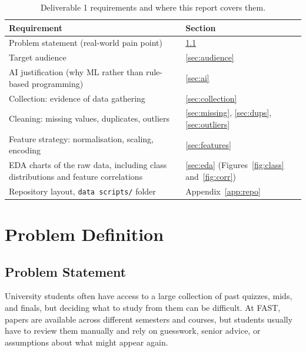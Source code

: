 \documentclass[11pt,a4paper]{article}
\newcommand{\file}[1]{\texttt{#1}}
\begin{document}
\begin{table}[H]
\centering
\caption{Deliverable 1 requirements and where this report covers them.}
\label{tab:map}
\begin{tabularx}{\linewidth}{>{\raggedright\arraybackslash}Xl}
\toprule
Requirement & Section \\
\midrule
Problem statement (real-world pain point) & \ref{sec:problem} \\
Target audience & \ref{sec:audience} \\
AI justification (why ML rather than rule-based programming) & \ref{sec:ai} \\
Collection: evidence of data gathering & \ref{sec:collection} \\
Cleaning: missing values, duplicates, outliers & \ref{sec:missing}, \ref{sec:dups}, \ref{sec:outliers} \\
Feature strategy: normalisation, scaling, encoding & \ref{sec:features} \\
EDA charts of the raw data, including class distributions and feature correlations & \ref{sec:eda} (Figures~\ref{fig:class} and~\ref{fig:corr}) \\
Repository layout, \file{data scripts/} folder & Appendix~\ref{app:repo} \\
\bottomrule
\end{tabularx}
\end{table}

\section{Problem Definition}

\subsection{Problem Statement}
\label{sec:problem}
University students often have access to a large collection of past quizzes, mids, and finals, but deciding what to study from them can be difficult. At FAST, papers are available across different semesters and courses, but students usually have to review them manually and rely on guesswork, senior advice, or assumptions about what might appear again.
\end{document}
